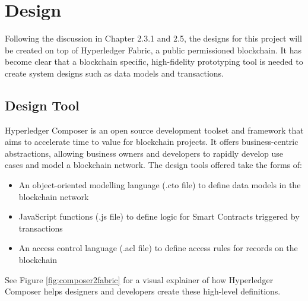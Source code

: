 \chapter{Design}
\graphicspath{{Chapter5/Figs/Raster/}{Chapter5/Figs/Tex/}{Chapter5/Figs/}}

Following the discussion in Chapter 2.3.1 and 2.5, the designs for this project
will be created on top of Hyperledger Fabric, a public permissioned blockchain.
It has become clear that a blockchain specific, high-fidelity prototyping tool is needed
to create system designs such as data models and transactions.

\section{Design Tool}

Hyperledger Composer is an open source development toolset and framework that aims to
accelerate time to value for blockchain projects. It offers business-centric
abstractions, allowing business owners and developers to rapidly develop
use cases and model a blockchain network. The design tools offered take the forms of:
\begin{itemize}
	\setlength\itemsep{0em}
	\item An object-oriented modelling language (.cto file) to define data models in
	      the blockchain network
	\item JavaScript functions (.js file) to define logic for Smart Contracts triggered by transactions
	\item An access control language (.acl file) to define access rules for records on the blockchain\\
	      \citep{official2018composer}
\end{itemize}

See Figure \ref{fig:composer2fabric} for a visual explainer of how Hyperledger Composer
helps designers and developers create these high-level definitions.

